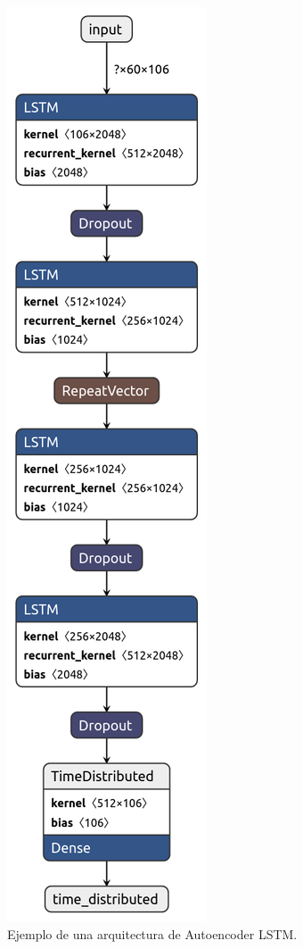\begin{figure}[H]
	\centering
	\includegraphics[scale=0.4]{imagenes/autoencoder-lstm.png}
	\caption{Ejemplo de una arquitectura de Autoencoder LSTM.}
	\label{img:autoencoder-lstm}
\end{figure}

